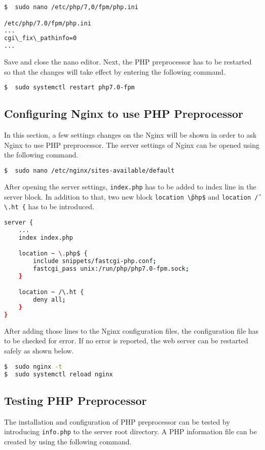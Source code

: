 \begin{lstlisting}[language=sh]
$  sudo nano /etc/php/7,0/fpm/php.ini

/etc/php/7.0/fpm/php.ini
...
cgi\_fix\_pathinfo=0
...
\end{lstlisting}

Save and close the nano editor. Next, the PHP preprocessor has to be restarted so that the changes will take effect by entering the following command.

\begin{lstlisting}[language=sh]
$  sudo systemctl restart php7.0-fpm
\end{lstlisting}

\subsection*{Configuring Nginx to use PHP Preprocessor}
In this section, a few settings changes on the Nginx will be shown in order to ask Nginx to use PHP preprocessor. The server settings of Nginx can be opened using the following command.

\begin{lstlisting}[language=sh]
$  sudo nano /etc/nginx/sites-available/default
\end{lstlisting}

After opening the server settings, \texttt{index.php} has to be added to index line in the server block. In addition to that, two new block \texttt{location \~\textbackslash php\$} and \texttt{location \~/\textbackslash .ht \{} has to be introduced.

\begin{lstlisting}[language=sh]
server {
    ...
    index index.php

    location ~ \.php$ {
        include snippets/fastcgi-php.conf;
        fastcgi_pass unix:/run/php/php7.0-fpm.sock;
    }

    location ~ /\.ht {
        deny all;
    }
}
\end{lstlisting}

After adding those lines to the Nginx configuration files, the configuration file has to be checked for error. If no error is reported, the web server can be restarted safely as shown below.

\begin{lstlisting}[language=sh]
$  sudo nginx -t
$  sudo systemctl reload nginx
\end{lstlisting}

\subsection*{Testing PHP Preprocessor}
The installation and configuration of PHP preprocessor can be tested by introducing \texttt{info.php} to the server root directory. A PHP information file can be created by using the following command.


